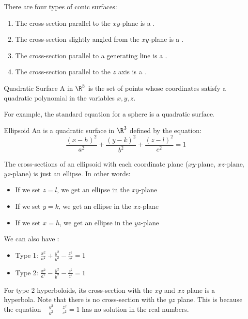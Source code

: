 \documentclass[math]{amznotes}
\begin{document}
There are four types of conic surfaces:
\begin{enumerate}[noitemsep]
    \item The cross-section parallel to the $xy$-plane is a .
    \item The cross-section slightly angled from the $xy$-plane is a .
    \item The cross-section parallel to a generating line is a .
    \item The cross-section parallel to the $z$ axis is a .
\end{enumerate}

\begin{dfnbox}{Quadratic Surface}{}
    A  in $\R^3$ is the set of points whose coordinates satisfy a quadratic polynomial in the variables $x,y,z$.
\end{dfnbox}

For example, the standard equation for a sphere is a quadratic surface.

\begin{dfnbox}{Ellipsoid}{}
    An  is a quadratic surface in $\R^3$ defined by the equation:
    \[ \frac{(x-h)^2}{a^2} + \frac{(y-k)^2}{b^2} + \frac{(z-l)^2}{c^2} = 1 \]
\end{dfnbox}

The cross-sections of an ellipsoid with each coordinate plane ($xy$-plane, $xz$-plane, $yz$-plane) is just an ellipse. In other words:
\begin{itemize}[noitemsep]
    \item If we set $z = l$, we get an ellipse in the $xy$-plane
    \item If we set $y = k$, we get an ellipse in the $xz$-plane
    \item If we set $x = h$, we get an ellipse in the $yz$-plane
\end{itemize}

We can also have :
\begin{itemize}
    \item Type 1: $\frac{x^2}{a^2} + \frac{y^2}{b^2} - \frac{z^2}{c^2} = 1$
    \item Type 2: $\frac{x^2}{a^2} - \frac{y^2}{b^2} - \frac{z^2}{c^2} = 1$
\end{itemize}

For type 2 hyperboloids, its cross-section with the $xy$ and $xz$ plane is a hyperbola. Note that there is no cross-section with the $yz$ plane. This is because the equation $- \frac{y^2}{b^2} - \frac{z^2}{c^2} = 1$ has no solution in the real numbers.
\end{document}
